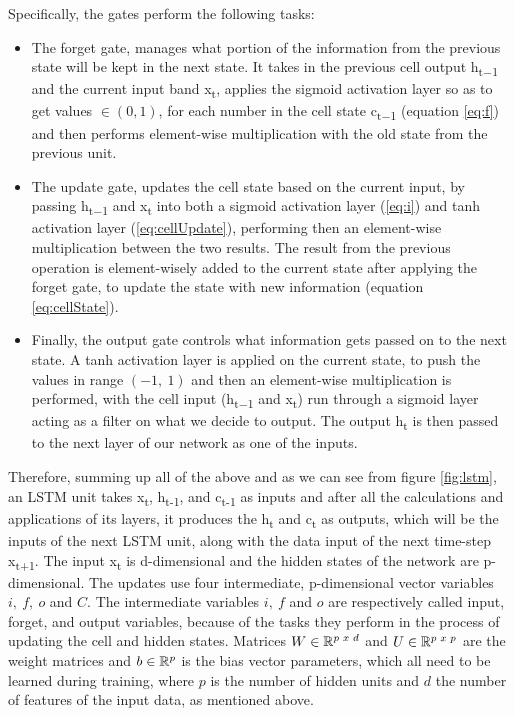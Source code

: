     Specifically, the gates perform the following tasks:
    \begin{itemize}
        \item 
        The forget gate, manages what portion of the information from the previous state will be kept in the next state. It takes in the previous cell output h\textsubscript{t−1} and the current input band x\textsubscript{t}, applies the sigmoid activation layer so as to get values $\in (0,1)$, for each number in the cell state c\textsubscript{t−1} (equation \ref{eq:f}) and then performs element-wise multiplication with the old state from the previous unit.

        \item
        The update gate, updates the cell state based on the current input, by passing h\textsubscript{t−1} and x\textsubscript{t} into both a sigmoid activation layer (\ref{eq:i}) and tanh activation layer (\ref{eq:cellUpdate}), performing then an element-wise multiplication between the two results. The result from the previous operation is element-wisely added to the current state after applying the forget gate, to update the state with new information (equation \ref{eq:cellState}).    
       
        \item 
        Finally, the output gate controls what information gets passed on to the next state. A tanh activation layer is applied on the current state, to push the values in range $(-1,\ 1)$ and then an element-wise multiplication is performed, with the cell input (h\textsubscript{t−1} and x\textsubscript{t}) run through a sigmoid layer acting as a filter on what we decide to output. The output h\textsubscript{t} is then passed to the next layer of our network as one of the inputs.
        
    \end{itemize} 
    
    Therefore, summing up all of the above and as we can see from figure \ref{fig:lstm}, an LSTM unit takes x\textsubscript{t}, h\textsubscript{t-1}, and c\textsubscript{t-1} as inputs and after all the calculations and applications of its layers, it produces the h\textsubscript{t} and c\textsubscript{t} as outputs, which will be the inputs of the next LSTM unit, along with the data input of the next time-step  x\textsubscript{t+1}. The input x\textsubscript{t} is d-dimensional and the hidden states of the network are p-dimensional. The updates use four intermediate, p-dimensional vector variables $i,\ f,\ o$ and $C$. The intermediate variables $i,\ f$ and $o$ are respectively called input, forget, and output variables, because of the tasks they perform in the process of updating the cell and hidden states. Matrices $W \in \mathbb{R}\textsuperscript{$p\ x\ d$}$ and $U \in \mathbb{R}\textsuperscript{$p\ x\ p$}$ are the weight matrices and $b \in \mathbb{R}\textsuperscript{$p$} $ is the bias vector parameters, which all need to be learned during training, where $p$ is the number of hidden units and $d$ the number of features of the input data, as mentioned above.
    
